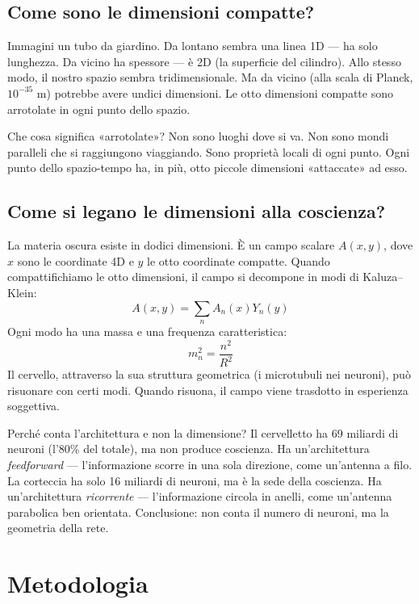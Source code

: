 \documentclass[11pt,a4paper]{article}
\begin{document}
\subsection{Come sono le dimensioni compatte?}
Immagini un tubo da giardino. Da lontano sembra una linea 1D --- ha solo lunghezza. Da vicino ha spessore --- è 2D (la superficie del cilindro). Allo stesso modo, il nostro spazio sembra tridimensionale. Ma da vicino (alla scala di Planck, $10^{-35}$ m) potrebbe avere undici dimensioni. Le otto dimensioni compatte sono arrotolate in ogni punto dello spazio.

Che cosa significa «arrotolate»? Non sono luoghi dove si va. Non sono mondi paralleli che si raggiungono viaggiando. Sono proprietà locali di ogni punto. Ogni punto dello spazio-tempo ha, in più, otto piccole dimensioni «attaccate» ad esso.

\subsection{Come si legano le dimensioni alla coscienza?}
La materia oscura esiste in dodici dimensioni. È un campo scalare $A(x,y)$, dove $x$ sono le coordinate 4D e $y$ le otto coordinate compatte. Quando compattifichiamo le otto dimensioni, il campo si decompone in modi di Kaluza--Klein:
\begin{equation}
A(x,y) = \sum_n A_n(x) Y_n(y)
\end{equation}
Ogni modo ha una massa e una frequenza caratteristica:
\begin{equation}
m_n^2 = \frac{n^2}{R^2}
\end{equation}
Il cervello, attraverso la sua struttura geometrica (i microtubuli nei neuroni), può risuonare con certi modi. Quando risuona, il campo viene trasdotto in esperienza soggettiva.

Perché conta l'architettura e non la dimensione? Il cervelletto ha 69 miliardi di neuroni (l'80\% del totale), ma non produce coscienza. Ha un'architettura \textit{feedforward} --- l'informazione scorre in una sola direzione, come un'antenna a filo. La corteccia ha solo 16 miliardi di neuroni, ma è la sede della coscienza. Ha un'architettura \textit{ricorrente} --- l'informazione circola in anelli, come un'antenna parabolica ben orientata. Conclusione: non conta il numero di neuroni, ma la geometria della rete.

\section{Metodologia}
\end{document}
